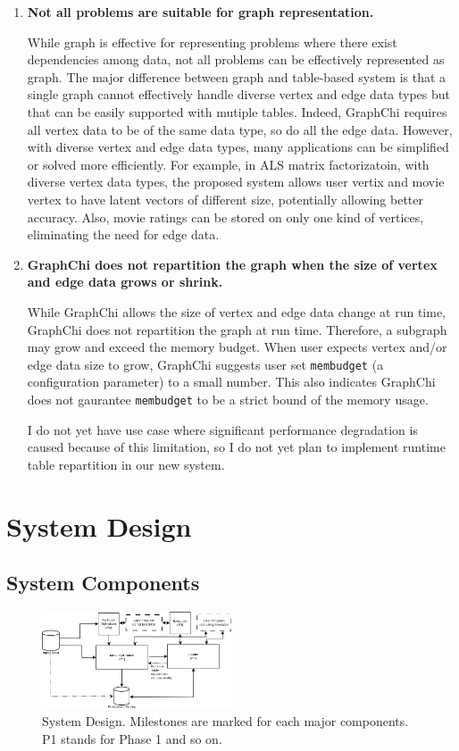 \documentclass[10pt, twocolumn, a4paper]{article}
\begin{document}
\begin{enumerate}
\item \textbf{Not all problems are suitable for graph representation.}

While graph is effective for representing problems where there exist dependencies among data, not all problems can be effectively represented as graph. The major difference between graph and table-based system is that a single graph cannot effectively handle diverse vertex and edge data types but that can be easily supported with mutiple tables. Indeed, GraphChi requires all vertex data to be of the same data type, so do all the edge data. However, with diverse vertex and edge data types, many applications can be simplified or solved more efficiently. For example, in ALS matrix factorizatoin, with diverse vertex data types, the proposed system allows user vertix and movie vertex to have latent vectors of different size, potentially allowing better accuracy. Also, movie ratings can be stored on only one kind of vertices, eliminating the need for edge data.

\item \textbf{GraphChi does not repartition the graph when the size of vertex and edge data grows or shrink.}

While GraphChi allows the size of vertex and edge data change at run time, GraphChi does not repartition the graph at run time. Therefore, a subgraph may grow and exceed the memory budget. When user expects vertex and/or edge data size to grow, GraphChi suggests user set \texttt{membudget} (a configuration parameter) to a small number. This also indicates GraphChi does not gaurantee \texttt{membudget} to be a strict bound of the memory usage. 

I do not yet have use case where significant performance degradation is caused because of this limitation, so I do not yet plan to implement runtime table repartition in our new system.

\end{enumerate}
\section{System Design}
\label{sec:system}

\subsection{System Components}
\begin{figure}[h]
  \includegraphics[width=0.5\textwidth]{graphs/system-design.png}
  \caption{System Design. Milestones are marked for each major components. P1 stands for Phase 1 and so on.}
  \label{fig:sysdesign}
\end{figure}
\end{document}
